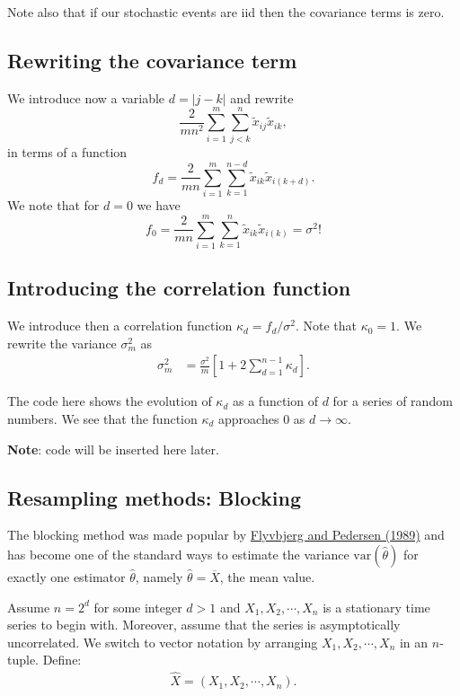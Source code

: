 \documentclass[%
oneside,                 %
final,                   %
10pt]{article}
\begin{document}
Note also that if our stochastic events are iid then the covariance terms is zero.

\subsection*{Rewriting the covariance term}

We introduce now a variable $d=\vert j-k\vert $ and rewrite 
\[
\frac{2}{mn^2}\sum_{i=1}^{m} \sum_{j<k}^{n}\tilde{x}_{ij}\tilde{x}_{ik},
\]
in terms of a function
\[
f_d=\frac{2}{mn}\sum_{i=1}^{m} \sum_{k=1}^{n-d}\tilde{x}_{ik}\tilde{x}_{i(k+d)}.
\]
We note that for $d=0$ we have
\[
f_0=\frac{2}{mn}\sum_{i=1}^{m} \sum_{k=1}^{n}\tilde{x}_{ik}\tilde{x}_{i(k)}=\sigma^2!
\]

\subsection*{Introducing the correlation function}

We introduce then a correlation function $\kappa_d=f_d/\sigma^2$. Note that $\kappa_0 =1$.  We rewrite the variance $\sigma_m^2$ as
\begin{align*}
\sigma^2_{m}& = \frac{\sigma^2}{m}\left[1+2\sum_{d=1}^{n-1} \kappa_d\right].
\end{align*}

The code here shows the evolution of $\kappa_d$ as a function of $d$ for a series of random numbers. We see that the function $\kappa_d$ approaches $0$ as $d\rightarrow \infty$.

\textbf{Note}: code will be inserted here later.

\subsection*{Resampling methods: Blocking}

The blocking method was made popular by \href{{https://aip.scitation.org/doi/10.1063/1.457480}}{Flyvbjerg and Pedersen (1989)}
and has become one of the standard ways to estimate the variance
$\mathrm{var}(\widehat{\theta})$ for exactly one estimator $\widehat{\theta}$, namely
$\widehat{\theta} = \overline{X}$, the mean value. 

Assume $n = 2^d$ for some integer $d>1$ and $X_1,X_2,\cdots, X_n$ is a stationary time series to begin with. 
Moreover, assume that the series is asymptotically uncorrelated. We switch to vector notation by arranging $X_1,X_2,\cdots,X_n$ in an $n$-tuple. Define:
\begin{align*}
\hat{X} = (X_1,X_2,\cdots,X_n).
\end{align*}
\end{document}
